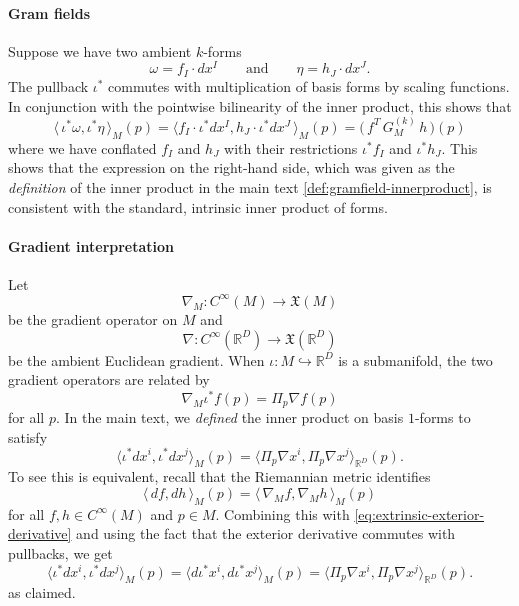 \documentclass{article}
\newcommand{\R}{\mathbb{R}}
\theoremstyle{remark}
\theoremstyle{plain}
\begin{document}
\paragraph{Gram fields} Suppose we have two ambient $k$-forms
\begin{equation}
    \omega = f_I \cdot dx^I \qquad \text{and} \qquad \eta = h_J \cdot dx^J.
\end{equation} The pullback $\iota^*$ commutes with multiplication of basis forms by scaling functions. In conjunction with the pointwise bilinearity of the inner product, this shows that
\begin{equation}
    \langle\, \iota^* \omega, \iota^*\eta\, \rangle_M(p) = \Big\langle f_I \cdot \iota^*dx^I, h_J \cdot \iota^* dx^J \, \Big \rangle_M(p) = \Big( \,f^T \, G^{(k)}_M \, h\, \Big)(p)
\end{equation} where we have conflated $f_I$ and $h_J$ with their restrictions $\iota^* f_I$ and $\iota^* h_J$. This shows that the expression on the right-hand side, which was given as the \textit{definition} of the inner product in the main text \ref{def:gramfield-innerproduct}, is consistent with the standard, intrinsic inner product of forms. 



\paragraph{Gradient interpretation} Let 
\begin{equation} 
\nabla_M : C^\infty(M) \to \mathfrak{X}(M)
\end{equation}be the gradient operator on $M$ and 
\begin{equation} 
\nabla : C^\infty(\R^D) \to \mathfrak{X}(\R^D)
\end{equation} be the ambient Euclidean gradient. When $\iota : M \hookrightarrow \R^D$ is a submanifold, the two gradient operators are related by
\begin{equation} \label{eq:extrinsic-exterior-derivative}
    \nabla_M \iota^*f(p) = \Pi_p \nabla f(p)
\end{equation} for all $p$. In the main text, we \textit{defined} the inner product on basis $1$-forms to satisfy
\begin{equation} \label{eq:pullback-projection-equiv}
    \Big\langle \iota ^*dx^i, \iota^*dx^j \Big\rangle_M(p) = \Big\langle \Pi_p \nabla x^i, \Pi_p \nabla x^j\Big\rangle_{\R^D}(p).
\end{equation} To see this is equivalent, recall that the Riemannian metric identifies
\begin{equation}
    \langle \, df,dh \, \rangle_M(p ) = \langle \, \nabla_M f, \nabla_Mh \, \rangle_M(p)
\end{equation} for all $f,h \in C^\infty(M)$ and $p \in M$. Combining this with \ref{eq:extrinsic-exterior-derivative} and using the fact that the exterior derivative commutes with pullbacks, we get
\begin{equation}
    \Big\langle \iota ^*dx^i, \iota^*dx^j \Big\rangle_M(p) = \Big\langle d\iota ^*x^i, d\iota^*x^j \Big\rangle_M(p) = \Big\langle \Pi_p \nabla x^i, \Pi_p \nabla x^j\Big\rangle_{\R^D}(p).
\end{equation} as claimed.
\end{document}
